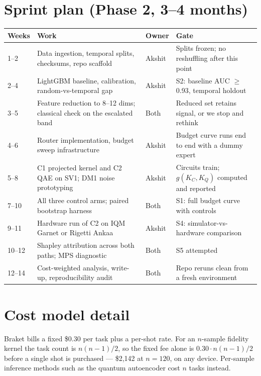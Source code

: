 \documentclass[10pt,a4paper]{article}
\begin{document}
\normalsize
\section{Sprint plan (Phase 2, 3--4 months)}

\small
\begin{center}
\setlength{\tabcolsep}{5pt}
\begin{tabular}{@{}lp{62mm}lp{52mm}@{}}
\toprule
Weeks & Work & Owner & Gate \\
\midrule
1--2  & Data ingestion, temporal splits, checksums, repo scaffold & Akshit & Splits frozen; no reshuffling after this point \\
2--4  & LightGBM baseline, calibration, random-vs-temporal gap & Akshit & S2: baseline AUC $\geq$ 0.93, temporal holdout \\
3--5  & Feature reduction to 8--12 dims; classical check on the escalated band & Both & Reduced set retains signal, or we stop and rethink \\
4--6  & Router implementation, budget sweep infrastructure & Akshit & Budget curve runs end to end with a dummy expert \\
5--8  & C1 projected kernel and C2 QAE on SV1; DM1 noise prototyping & Akshit & Circuits train; $g(K_C,K_Q)$ computed and reported \\
7--10 & All three control arms; paired bootstrap harness & Both & S1: full budget curve with controls \\
9--11 & Hardware run of C2 on IQM Garnet or Rigetti Ankaa & Akshit & S4: simulator-vs-hardware comparison \\
10--12& Shapley attribution across both paths; MPS diagnostic & Both & S5 attempted \\
12--14& Cost-weighted analysis, write-up, reproducibility audit & Both & Repo reruns clean from a fresh environment \\
\bottomrule
\end{tabular}
\end{center}

\normalsize
\section{Cost model detail}

\small
Braket bills a fixed \$0.30 per task plus a per-shot rate. For an $n$-sample fidelity kernel the task count is $n(n{-}1)/2$, so the fixed fee alone is $0.30 \cdot n(n{-}1)/2$ before a single shot is purchased --- \$2{,}142 at $n{=}120$, on any device. Per-sample inference methods such as the quantum autoencoder cost $n$ tasks instead.
\end{document}
